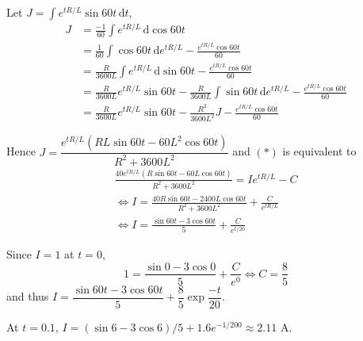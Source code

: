 \documentclass[a4paper,12pt]{article}
\newcommand{\ud}{\,\mathrm{d}}
\begin{document}
Let $J = \int e^{tR/L}\sin 60t\ud t$,
\begin{align*}
J &= \frac{-1}{60}\int e^{tR/L}\ud\cos 60t\\
  &= \frac{1}{60}\int\cos 60t\ud e^{tR/L} - \frac{e^{tR/L}\cos 60t}{60}\\
  &= \frac{R}{3600L}\int e^{tR/L}\ud\sin 60t - \frac{e^{tR/L}\cos 60t}{60}\\
  &= \frac{R}{3600L}e^{tR/L}\sin 60t - \frac{R}{3600L}\int\sin 60t\ud e^{tR/L}
   - \frac{e^{tR/L}\cos 60t}{60}\\
  &= \frac{R}{3600L}e^{tR/L}\sin 60t - \frac{R^2}{3600L^2}J
   - \frac{e^{tR/L}\cos 60t}{60}
\end{align*}

Hence $J = \dfrac{e^{tR/L}(RL\sin 60t - 60L^2\cos 60t)}{R^2+3600L^2}$
and $(*)$ is equivalent to
\begin{multline*}
  \frac{40e^{tR/L}(R\sin 60t - 60L\cos 60t)}{R^2+3600L^2} = Ie^{tR/L} - C\\
  \iff I = \frac{40R\sin 60t - 2400L\cos 60t}{R^2+3600L^2}
    + \frac{C}{e^{tR/L}}\\
  \iff I = \frac{\sin 60t - 3\cos 60t}{5}
    + \frac{C}{e^{t/20}}
\end{multline*}

Since $I = 1$ at $t = 0$,
\[1 = \frac{\sin 0 - 3\cos 0}{5} + \frac{C}{e^0} \iff C = \frac 8 5\]
and thus $I = \dfrac{\sin 60t - 3\cos 60t}{5} + \dfrac{8}{5}\exp\dfrac{-t}{20}$.

At $t = 0.1$, $I = (\sin 6 - 3\cos 6)/5 + 1.6e^{-1/200} \approx 2.11$ A.
\end{document}
